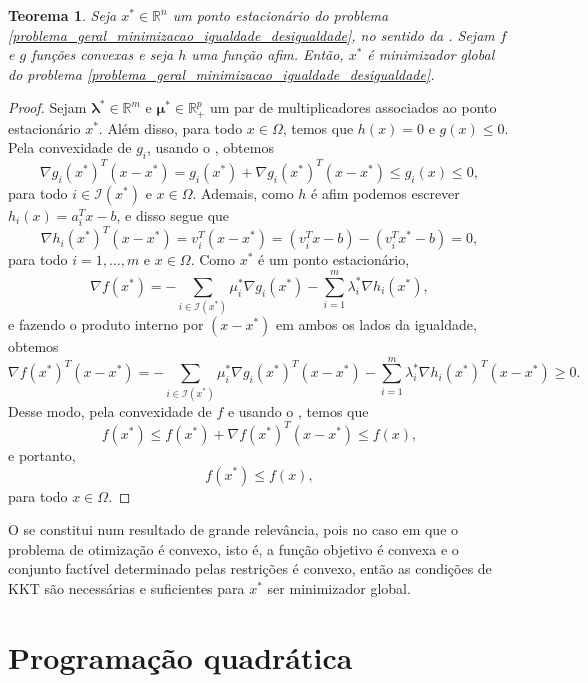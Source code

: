 \documentclass[12pt,a4paper]{scrartcl}
\def\RR{\mathds{R}}
\newtheorem{teo}{Teorema}
\theoremstyle{definition}%
\begin{document}
\begin{teo} \label{teo:pontoestacionario_minimizadorglobal_convexidade}
Seja $x^{*} \in \RR^{n}$ um ponto estacionário do problema \eqref{problema_geral_minimizacao_igualdade_desigualdade}, no sentido da . Sejam $f$ e $g$ funções convexas e seja $h$ uma função afim. Então, $x^{*}$ é minimizador global do problema \eqref{problema_geral_minimizacao_igualdade_desigualdade}.
\end{teo}
\begin{proof}
Sejam $\boldsymbol{\lambda}^{*} \in \RR^{m}$ e $\boldsymbol{\mu}^{*} \in \RR^{p}_{+}$ um par de multiplicadores associados ao ponto estacionário $x^{*}$. Além disso, para todo $x\in \Omega$, temos que $h(x) = 0$ e $g(x) \leq 0$. Pela convexidade de $g_{i}$, usando o , obtemos
\[
\nabla g_{i}(x^{*})^{T} (x - x^{*}) = g_{i}(x^{*}) + \nabla g_{i}(x^{*})^{T}(x - x^{*}) \leq g_{i}(x) \leq 0,
\]
para todo $i \in \mathcal{I}(x^{*})$ e $x\in \Omega$. Ademais, como $h$ é afim podemos escrever $h_{i}(x) = a_{i}^{T}x - b$, e disso segue que
\[
\nabla h_{i}(x^{*})^{T}(x - x^{*}) = v_{i}^{T}(x - x^{*}) = (v_{i}^{T}x - b) - (v_{i}^{T}x^{*} - b) = 0,
\]
para todo $i = 1, \ldots , m$ e $x \in \Omega$. Como $x^{*}$ é um ponto estacionário,
\[
\nabla f(x^{*}) = - \sum_{i\in \mathcal{I}(x^{*})} \mu_{i}^{*} \nabla g_{i}(x^{*}) - \sum_{i=1}^{m} \lambda_{i}^{*} \nabla h_{i}(x^{*}) ,
\]
e fazendo o produto interno por $(x - x^{*})$ em ambos os lados da igualdade, obtemos
\[
\nabla f(x^{*})^{T} (x - x^{*}) = - \sum_{i\in \mathcal{I}(x^{*})} \mu_{i}^{*} \nabla g_{i}(x^{*})^{T} (x - x^{*}) - \sum_{i=1}^{m} \lambda_{i}^{*} \nabla h_{i}(x^{*})^{T} (x - x^{*}) \geq 0.
\]
Desse modo, pela convexidade de $f$ e usando o , temos que
\[
f(x^{*}) \leq f(x^{*}) + \nabla f(x^{*})^{T} (x - x^{*}) \leq f(x),
\]
e portanto,
\[
f(x^{*}) \leq f(x),
\]
para todo $x \in \Omega$.
\end{proof}

O  se constitui num resultado de grande relevância, pois no caso em que o problema de otimização é convexo, isto é, a função objetivo é convexa e o conjunto factível determinado pelas restrições é convexo, então as condições de KKT são necessárias e suficientes para $x^{*}$ ser minimizador global.


\section{Programação quadrática}
\end{document}
